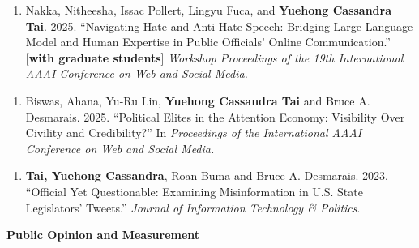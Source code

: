 \documentclass[10.5pt,]{article}
\providecommand{\tightlist}{%
	\setlength{\itemsep}{0pt}\setlength{\parskip}{0pt}}
\renewenvironment{itemize}{
	\begin{list}{}{
			\setlength{\leftmargin}{1.5em}
		}
	}{
	\end{list}
}
\begin{document}
\begin{itemize}
\begin{itemize}
\begin{enumerate}
    \def\labelenumi{\arabic{enumi}.}
    \setcounter{enumi}{11}
    \tightlist
    \item
      Nakka, Nitheesha, Issac Pollert, Lingyu Fuca, and \textbf{Yuehong
      Cassandra Tai}. 2025. ``Navigating Hate and Anti-Hate Speech:
      Bridging Large Language Model and Human Expertise in Public
      Oﬀicials' Online Communication.'' {[}\textbf{with graduate
      students}{]} \emph{Workshop Proceedings of the 19th International
      AAAI Conference on Web and Social Media.}
    \end{enumerate}
  \item
    \begin{enumerate}
    \def\labelenumi{\arabic{enumi}.}
    \setcounter{enumi}{10}
    \tightlist
    \item
      Biswas, Ahana, Yu-Ru Lin, \textbf{Yuehong Cassandra Tai} and Bruce
      A. Desmarais. 2025. ``Political Elites in the Attention Economy:
      Visibility Over Civility and Credibility?'' In \emph{Proceedings
      of the International AAAI Conference on Web and Social Media.}
    \end{enumerate}
  \item
    \begin{enumerate}
    \def\labelenumi{\arabic{enumi}.}
    \setcounter{enumi}{9}
    \tightlist
    \item
      \textbf{Tai, Yuehong Cassandra}, Roan Buma and Bruce A. Desmarais.
      2023. ``Oﬀicial Yet Questionable: Examining Misinformation in U.S.
      State Legislators' Tweets.'' \emph{Journal of Information
      Technology \& Politics}.
    \end{enumerate}
  \end{itemize}
\item
  \textbf{Public Opinion and Measurement}


\end{itemize}
\end{document}
